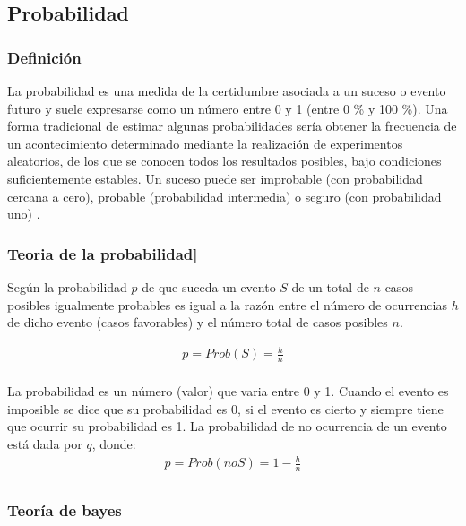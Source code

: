 \subsection{Probabilidad}

\subsubsection{Definición}

La probabilidad es una medida de la certidumbre asociada a un suceso o evento futuro y suele expresarse como un número entre 0 y 1 (entre 0 \% y 100 \%). 
\vskip 0.1cm 
Una forma tradicional de estimar algunas probabilidades sería obtener la frecuencia de un acontecimiento determinado mediante la realización de experimentos aleatorios, de los que se conocen todos los resultados posibles, bajo condiciones suficientemente estables. Un suceso puede ser improbable (con probabilidad cercana a cero), probable (probabilidad intermedia) o seguro (con probabilidad uno) \citep{loeve}.

\subsubsection{Teoria de la probabilidad]}

Según \citep{alvarez_rojas} la probabilidad \(p\) de que suceda un evento \(S\) de un total de \(n\) casos posibles igualmente probables es igual a la razón entre el número de ocurrencias \(h\) de dicho evento (casos favorables) y el número total de casos posibles \(n\).

\begin{align*}
p = Prob(S) = \frac{h}{n}\\
\end{align*}

La probabilidad es un número (valor) que varia entre 0 y 1. Cuando el evento es imposible se dice que su probabilidad es 0, si el evento es cierto y siempre tiene que ocurrir su probabilidad es 1.
La probabilidad de no ocurrencia de un evento está dada por \(q\), donde:
\begin{align*}
p = Prob(noS) = 1 - \frac{h}{n}\\
\end{align*}


\subsubsection{Teoría de bayes}

